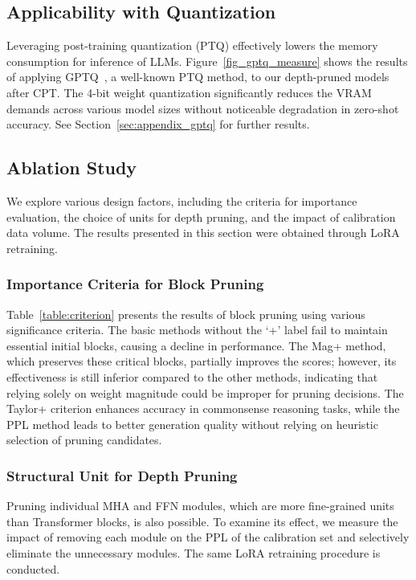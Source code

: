 \subsection{Applicability with Quantization} 
Leveraging post-training quantization (PTQ) effectively lowers the memory consumption for inference of LLMs. Figure~\ref{fig_gptq_measure} shows the results of applying GPTQ~\cite{frantar2023optq}, a well-known PTQ method, to our depth-pruned models after CPT. The 4-bit weight quantization significantly reduces the VRAM demands across various model sizes without noticeable degradation in zero-shot accuracy. See Section~\ref{sec:appendix_gptq} for further results.

\subsection{Ablation Study}
We explore various design factors, including the criteria for importance evaluation, the choice of units for depth pruning, and the impact of calibration data volume. The results presented in this section were obtained through LoRA retraining.

\subsubsection{Importance Criteria for Block Pruning} 
Table~\ref{table:criterion} presents the results of block pruning using various significance criteria. The basic methods without the `+' label fail to maintain essential initial blocks, causing a decline in performance. The Mag+ method, which preserves these critical blocks, partially improves the scores; however, its effectiveness is still inferior compared to the other methods, indicating that relying solely on weight magnitude could be improper for pruning decisions. The Taylor+ criterion enhances accuracy in commonsense reasoning tasks, while the PPL method leads to better generation quality without relying on heuristic selection of pruning candidates.

\subsubsection{Structural Unit for Depth Pruning} 
Pruning individual MHA and FFN modules, which are more fine-grained units than Transformer blocks, is also possible. To examine its effect, we measure the impact of removing each module on the PPL of the calibration set and selectively eliminate the unnecessary modules. The same LoRA retraining procedure is conducted.

